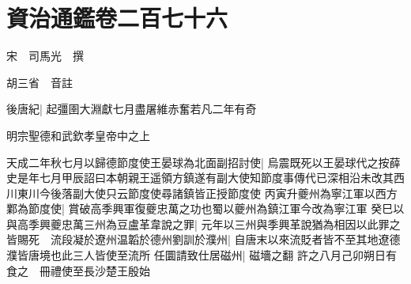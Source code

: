 \section{資治通鑑卷二百七十六}
宋　司馬光　撰

胡三省　音註

後唐紀|{
	起彊圉大淵獻七月盡屠維赤奮若凡二年有奇}


明宗聖德和武欽孝皇帝中之上

天成二年秋七月以歸德節度使王晏球為北面副招討使|{
	烏震既死以王晏球代之按薛史是年七月甲辰詔曰本朝親王遥領方鎮遂有副大使知節度事傳代已深相沿未改其西川東川今後落副大使只云節度使尋諸鎮皆正授節度使}
丙寅升夔州為寧江軍以西方鄴為節度使|{
	賞破高季興軍復夔忠萬之功也蜀以夔州為鎮江軍今改為寧江軍}
癸巳以與高季興夔忠萬三州為豆盧革韋說之罪|{
	元年以三州與季興革說猶為相因以此罪之}
皆賜死　流段凝於遼州温韜於德州劉訓於濮州|{
	自唐末以來流貶者皆不至其地遼德濮皆唐境也此三人皆使至流所}
任圜請致仕居磁州|{
	磁墻之翻}
許之八月己卯朔日有食之　冊禮使至長沙楚王殷始


